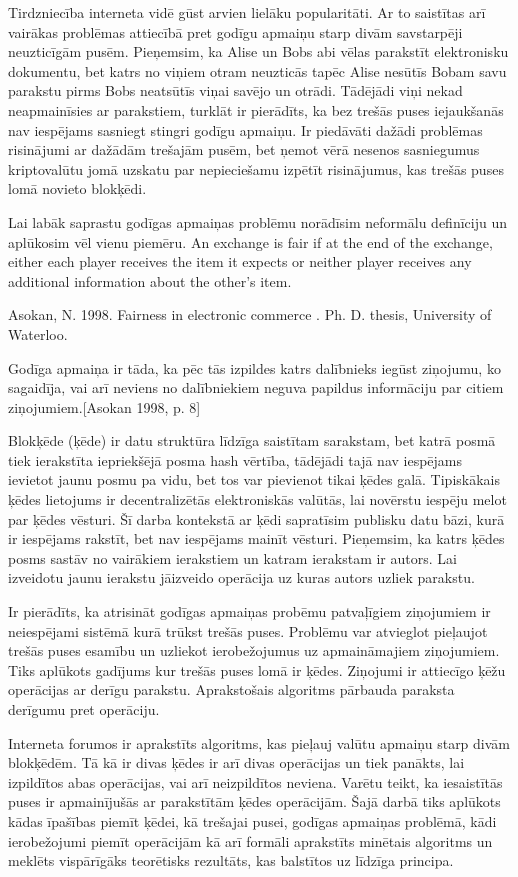 Tirdzniecība interneta vidē gūst arvien lielāku popularitāti. Ar to saistītas arī vairākas problēmas attiecībā pret godīgu apmaiņu starp divām savstarpēji neuzticīgām pusēm. Pieņemsim, ka Alise un Bobs abi vēlas parakstīt elektronisku dokumentu, bet katrs no viņiem otram neuzticās tapēc Alise nesūtīs Bobam savu parakstu pirms Bobs neatsūtīs viņai savējo un otrādi. Tādējādi viņi nekad neapmainīsies ar parakstiem, turklāt ir pierādīts, ka bez trešās puses iejaukšanās nav iespējams sasniegt stingri godīgu apmaiņu. \cite{pagnia99}
Ir piedāvāti dažādi problēmas risinājumi ar dažādām trešajām pusēm, bet ņemot vērā nesenos sasniegumus kriptovalūtu jomā uzskatu par nepieciešamu izpētīt risinājumus, kas trešās puses lomā novieto blokķēdi. 

Lai labāk saprastu godīgas apmaiņas problēmu norādīsim neformālu definīciju un aplūkosim vēl vienu piemēru.  
An exchange is fair if at the end of the exchange, either each player
receives the item it expects or neither player receives any additional
information about the other's item. \cite[p.~8]{asokan98}

Asokan, N. 1998. Fairness in electronic commerce . Ph. D. thesis, University of Waterloo.

Godīga apmaiņa ir tāda, ka pēc tās izpildes katrs dalībnieks iegūst ziņojumu, ko sagaidīja, vai arī neviens no dalībniekiem neguva papildus informāciju par citiem ziņojumiem.[Asokan 1998, p. 8]

Blokķēde (ķēde) ir datu struktūra līdzīga saistītam sarakstam, bet katrā posmā tiek ierakstīta iepriekšējā posma hash vērtība, tādējādi tajā nav iespējams ievietot jaunu posmu pa vidu, bet tos var pievienot tikai ķēdes galā. 
Tipiskākais ķēdes lietojums ir decentralizētās elektroniskās valūtās, lai novērstu iespēju melot par ķēdes vēsturi. 
Šī darba kontekstā ar ķēdi sapratīsim publisku datu bāzi, kurā ir iespējams rakstīt, bet nav iespējams mainīt vēsturi.
Pieņemsim, ka katrs ķēdes posms sastāv no vairākiem ierakstiem un katram ierakstam ir autors.
Lai izveidotu jaunu ierakstu jāizveido operācija uz kuras autors uzliek parakstu.

Ir pierādīts, ka atrisināt godīgas apmaiņas probēmu patvaļīgiem ziņojumiem ir neiespējami sistēmā kurā trūkst trešās puses. 
Problēmu var atvieglot pieļaujot trešās puses esamību un uzliekot ierobežojumus uz apmaināmajiem ziņojumiem.
Tiks aplūkots gadījums kur trešās puses lomā ir ķēdes.
Ziņojumi ir attiecīgo ķēžu operācijas ar derīgu parakstu.
Aprakstošais algoritms pārbauda paraksta derīgumu pret operāciju. 

Interneta forumos ir aprakstīts algoritms, kas pieļauj valūtu apmaiņu starp divām blokķēdēm.
Tā kā ir divas ķēdes ir arī divas operācijas un tiek panākts, lai izpildītos abas operācijas, vai arī neizpildītos neviena.
Varētu teikt, ka iesaistītās puses ir apmainījušās ar parakstītām ķēdes operācijām.
Šajā darbā tiks aplūkots kādas īpašības piemīt ķēdei, kā trešajai pusei, godīgas apmaiņas problēmā, kādi ierobežojumi piemīt operācijām kā arī formāli aprakstīts minētais algoritms un meklēts vispārīgāks teorētisks rezultāts, kas balstītos uz līdzīga principa.



